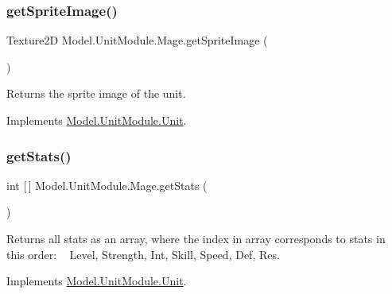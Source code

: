 \hypertarget{class_model_1_1_unit_module_1_1_mage_a1b771ad25cbaf34997af030b867a5131}{}\label{class_model_1_1_unit_module_1_1_mage_a1b771ad25cbaf34997af030b867a5131} 
\subsubsection{\texorpdfstring{get\+Sprite\+Image()}{getSpriteImage()}}
{\footnotesize\ttfamily Texture2D Model.\+Unit\+Module.\+Mage.\+get\+Sprite\+Image (\begin{DoxyParamCaption}{ }\end{DoxyParamCaption})\hspace{0.3cm}{\ttfamily [inline]}}

Returns the sprite image of the unit. 

Implements \hyperlink{interface_model_1_1_unit_module_1_1_unit_a797013e0463ea2e8c9ae8171f7d305f0}{Model.\+Unit\+Module.\+Unit}.

\hypertarget{class_model_1_1_unit_module_1_1_mage_aa7cb642ad7aadd1161f1d95e501dfd23}{}\label{class_model_1_1_unit_module_1_1_mage_aa7cb642ad7aadd1161f1d95e501dfd23} 
\subsubsection{\texorpdfstring{get\+Stats()}{getStats()}}
{\footnotesize\ttfamily int \mbox{[}$\,$\mbox{]} Model.\+Unit\+Module.\+Mage.\+get\+Stats (\begin{DoxyParamCaption}{ }\end{DoxyParamCaption})\hspace{0.3cm}{\ttfamily [inline]}}

Returns all stats as an array, where the index in array corresponds to stats in this order\+: ~\newline
 Level, Strength, Int, Skill, Speed, Def, Res. 

Implements \hyperlink{interface_model_1_1_unit_module_1_1_unit_a32890c6e0bf19a58dde71cc4240576a8}{Model.\+Unit\+Module.\+Unit}.

\hypertarget{class_model_1_1_unit_module_1_1_mage_a7a6f09d97b1065dfadd2b7722b80045d}{}\label{class_model_1_1_unit_module_1_1_mage_a7a6f09d97b1065dfadd2b7722b80045d} 

